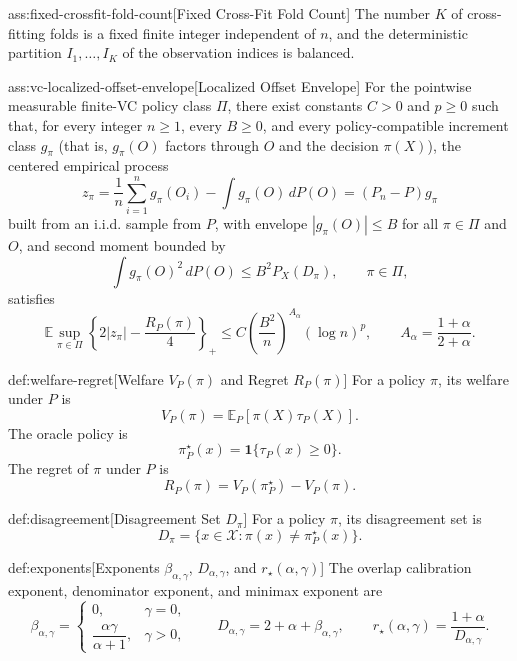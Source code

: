 \begin{assumptionv}{ass:fixed-crossfit-fold-count}[Fixed Cross-Fit Fold Count]
The number \(K\) of cross-fitting folds is a fixed finite integer independent of \(n\), and the deterministic partition \(I_1,\ldots,I_K\) of the observation indices is balanced.
\end{assumptionv}

\begin{assumptionv}{ass:vc-localized-offset-envelope}[Localized Offset Envelope]
For the pointwise measurable finite-VC policy class \(\Pi\), there exist constants \(C>0\) and \(p\ge0\) such that, for every integer \(n\ge1\), every \(B\ge0\), and every policy-compatible increment class \(g_\pi\) (that is, \(g_\pi(O)\) factors through \(O\) and the decision \(\pi(X)\)), the centered empirical process
\[
z_\pi=\frac1n\sum_{i=1}^n g_\pi(O_i)-\int g_\pi(O)\,dP(O)
=(P_n-P)g_\pi
\]
built from an i.i.d. sample from \(P\), with envelope \(|g_\pi(O)|\le B\) for all \(\pi\in\Pi\) and \(O\), and second moment bounded by
\[
\int g_\pi(O)^2\,dP(O)\le B^2 P_X(D_\pi),
\qquad \pi\in\Pi,
\]
satisfies
\[
\mathbb E\sup_{\pi\in\Pi}
\left\{2|z_\pi|-\frac{R_P(\pi)}{4}\right\}_+
\le
C\left(\frac{B^2}{n}\right)^{A_\alpha}(\log n)^p,
\qquad A_\alpha=\frac{1+\alpha}{2+\alpha}.
\]
\end{assumptionv}

\begin{definitionv}{def:welfare-regret}[Welfare \(V_P(\pi)\) and Regret \(R_P(\pi)\)]
For a policy \(\pi\), its welfare under \(P\) is
\[
V_P(\pi)=\mathbb E_P\!\left[\pi(X)\tau_P(X)\right].
\]
The oracle policy is
\[
\pi^\star_P(x)=\mathbf 1\{\tau_P(x)\ge 0\}.
\]
The regret of \(\pi\) under \(P\) is
\[
R_P(\pi)=V_P(\pi^\star_P)-V_P(\pi).
\]
\end{definitionv}

\begin{definitionv}{def:disagreement}[Disagreement Set \(D_\pi\)]
For a policy \(\pi\), its disagreement set is
\[
D_\pi=\{x\in\mathcal X:\pi(x)\ne \pi^\star_P(x)\}.
\]
\end{definitionv}

\begin{definitionv}{def:exponents}[Exponents $\beta_{\alpha,\gamma}$, $D_{\alpha,\gamma}$, and $r_\star(\alpha,\gamma)$]
The overlap calibration exponent, denominator exponent, and minimax exponent are
\[
\beta_{\alpha,\gamma}
=
\begin{cases}
0, & \gamma=0,\\
\dfrac{\alpha\gamma}{\alpha+1}, & \gamma>0,
\end{cases}
\qquad
D_{\alpha,\gamma}=2+\alpha+\beta_{\alpha,\gamma},
\qquad
r_\star(\alpha,\gamma)=\frac{1+\alpha}{D_{\alpha,\gamma}}.
\]
\end{definitionv}

